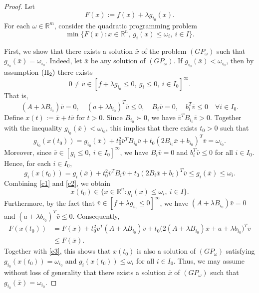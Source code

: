 \documentclass[]{interact}
\theoremstyle{plain}%
\theoremstyle{definition}
\theoremstyle{remark}
\begin{document}
	\begin{proof}
		Let
		$$
		F(x):=f(x)+\lambda g_{i_0}(x).
		$$
		For each $\omega\in \mathbb{R}^m$, consider the quadratic programming problem
		\begin{equation*}\tag{$GP_\omega$}
			\min \{F(x): x\in \mathbb{R}^n,\ g_i(x)\leq \omega_i,\ i\in I\}.
		\end{equation*}
		
		First, we show that there exists a solution $\bar x$ of the problem $(GP_\omega)$ such that
		$g_{i_0}(\bar x)=\omega_{i_0}$.
		Indeed, let $\bar x$ be any solution of $(GP_\omega)$.
		If $g_{i_0}(\bar x)<\omega_{i_0}$, then by assumption ${\rm (H_2)}$ there exists
		$$
		0\neq \bar v\in [f+\lambda g_{i_0}\leq 0,\ g_i\leq 0,\ i\in I_0]^\infty.
		$$
		That is,
		$$
		(A+\lambda B_{i_0})\bar v=0,\quad
		(a+\lambda b_{i_0})^T\bar v\leq 0,\quad
		B_i\bar v=0,\quad
		b_i^T\bar v\leq 0 \quad \forall i\in I_0.
		$$
		Define $x(t):=\bar x+t\bar v$ for $t>0$.
		Since $B_{i_0}\succ 0$, we have $\bar v^T B_{i_0}\bar v>0$.
		Together with the inequality $g_{i_0}(\bar x)<\omega_{i_0}$, this implies that there exists
		$t_0>0$ such that
		\begin{equation}\label{c1}
			g_{i_0}(x(t_0))
			=g_{i_0}(\bar x)
			+t_0^2\bar v^TB_{i_0}\bar v
			+t_0(2B_{i_0}\bar x+b_{i_0})^T\bar v
			=\omega_{i_0}.
		\end{equation}
		Moreover, since $\bar v\in [g_i\leq 0,\ i\in I_0]^\infty$, we have
		$B_i\bar v=0$ and $b_i^T\bar v\leq 0$ for all $i\in I_0$.
		Hence, for each $i\in I_0$,
		\begin{equation}\label{c2}
			g_i(x(t_0))
			=g_i(\bar x)
			+t_0^2\bar v^TB_i\bar v
			+t_0(2B_i\bar x+b_i)^T\bar v
			\leq g_i(\bar x)
			\leq \omega_i.
		\end{equation}
		Combining \eqref{c1} and \eqref{c2}, we obtain
		\begin{equation}\label{c3}
			x(t_0)\in \{x\in \mathbb{R}^n : g_i(x)\leq \omega_i,\ i\in I\}.
		\end{equation}
		Furthermore, by the fact that $\bar v\in [f+\lambda g_{i_0}\leq 0]^\infty$, we have
		$(A+\lambda B_{i_0})\bar v=0$ and $(a+\lambda b_{i_0})^T\bar v\leq 0$.
		Consequently,
		\begin{align*}
			F(x(t_0))
			&=F(\bar x)
			+t_0^2\bar v^T(A+\lambda B_{i_0})\bar v
			+t_0\big(2(A+\lambda B_{i_0})\bar x+a+\lambda b_{i_0}\big)^T\bar v \\
			&\leq F(\bar x).
		\end{align*}
		Together with \eqref{c3}, this shows that $x(t_0)$ is also a solution of $(GP_\omega)$
		satisfying $g_{i_0}(x(t_0))=\omega_{i_0}$ and $g_i(x(t_0))\leq \omega_i$ for all $i\in I_0$.
		Thus, we may assume without loss of generality that there exists a solution $\bar x$ of
		$(GP_\omega)$ such that $g_{i_0}(\bar x)=\omega_{i_0}$.
		

\end{proof}
\end{document}
